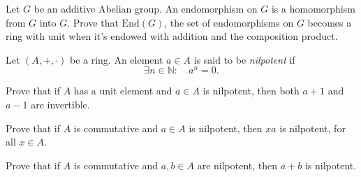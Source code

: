 \documentclass[
    11pt,a4paper,
]{exam}
\begin{document}
\begin{questions}
\begin{ejercicio}
Let $G$ be an additive Abelian group. An endomorphism on $G$ is a homomorphism from $G$ into $G$. Prove that $\mathrm{End}(G)$, the set of endomorphisms on $G$ becomes a ring with unit when it's endowed with addition and the composition product.
\end{ejercicio}

\begin{ejercicio}
Let $(A,+,\cdot)$ be a ring. An element $a\in A$ is said to be \emph{nilpotent} if
$$
\exists n\in \mathbb{N}:\quad a^n = 0.
$$
\begin{my_enumerate}
\item Prove that if $A$ has a unit element and $a\in A$ is nilpotent, then both $a+1$ and $a-1$ are invertible.
\item Prove that if $A$ is commutative and $a\in A$ is nilpotent, then $xa$ is nilpotent, for all $x\in A$.
\item Prove that if $A$ is commutative and $a,b\in A$  are nilpotent, then $a+b$ is nilpotent.
\end{my_enumerate}
\end{ejercicio}

\end{questions}
\end{document}
